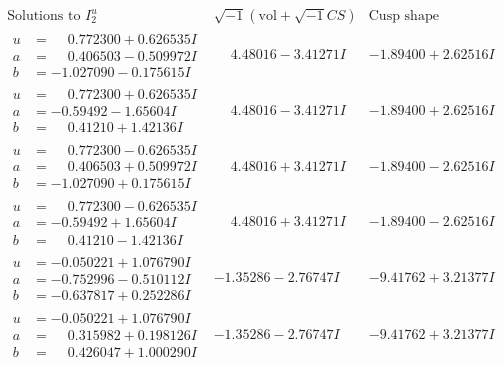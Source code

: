 \documentclass[1p]{elsarticle_modified}
\theoremstyle{definition}
\newcommand{\I}{\sqrt{-1}}
\begin{document}
$$\begin{array}{c|c|c}  
\text{Solutions to }I^u_{2}& \I (\text{vol} + \sqrt{-1}CS) & \text{Cusp shape}\\
 \hline 
\begin{aligned}
u &= \phantom{-}0.772300 + 0.626535 I \\
a &= \phantom{-}0.406503 - 0.509972 I \\
b &= -1.027090 - 0.175615 I\end{aligned}
 & \phantom{-}4.48016 - 3.41271 I & -1.89400 + 2.62516 I \\ \hline\begin{aligned}
u &= \phantom{-}0.772300 + 0.626535 I \\
a &= -0.59492 - 1.65604 I \\
b &= \phantom{-}0.41210 + 1.42136 I\end{aligned}
 & \phantom{-}4.48016 - 3.41271 I & -1.89400 + 2.62516 I \\ \hline\begin{aligned}
u &= \phantom{-}0.772300 - 0.626535 I \\
a &= \phantom{-}0.406503 + 0.509972 I \\
b &= -1.027090 + 0.175615 I\end{aligned}
 & \phantom{-}4.48016 + 3.41271 I & -1.89400 - 2.62516 I \\ \hline\begin{aligned}
u &= \phantom{-}0.772300 - 0.626535 I \\
a &= -0.59492 + 1.65604 I \\
b &= \phantom{-}0.41210 - 1.42136 I\end{aligned}
 & \phantom{-}4.48016 + 3.41271 I & -1.89400 - 2.62516 I \\ \hline\begin{aligned}
u &= -0.050221 + 1.076790 I \\
a &= -0.752996 - 0.510112 I \\
b &= -0.637817 + 0.252286 I\end{aligned}
 & -1.35286 - 2.76747 I & -9.41762 + 3.21377 I \\ \hline\begin{aligned}
u &= -0.050221 + 1.076790 I \\
a &= \phantom{-}0.315982 + 0.198126 I \\
b &= \phantom{-}0.426047 + 1.000290 I\end{aligned}
 & -1.35286 - 2.76747 I & -9.41762 + 3.21377 I \\ \hline\begin{aligned}

\end{aligned}
\end{array}$$
\end{document}
